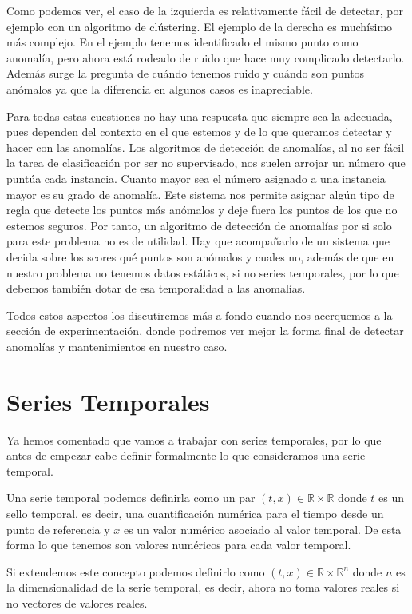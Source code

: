 Como podemos ver, el caso de la izquierda es relativamente fácil de detectar, por ejemplo con un algoritmo de clústering. El ejemplo de la derecha es muchísimo más complejo. En el ejemplo tenemos identificado el mismo punto como anomalía, pero ahora está rodeado de ruido que hace muy complicado detectarlo. Además surge la pregunta de cuándo tenemos ruido y cuándo son puntos anómalos ya que la diferencia en algunos casos es inapreciable.

Para todas estas cuestiones no hay una respuesta que siempre sea la adecuada, pues dependen del contexto en el que estemos y de lo que queramos detectar y hacer con las anomalías. Los algoritmos de detección de anomalías, al no ser fácil la tarea de clasificación por ser no supervisado, nos suelen arrojar un número que puntúa cada instancia. Cuanto mayor sea el número asignado a una instancia mayor es su grado de anomalía. Este sistema nos permite asignar algún tipo de regla que detecte los puntos más anómalos y deje fuera los puntos de los que no estemos seguros. Por tanto, un algoritmo de detección de anomalías por si solo para este problema no es de utilidad. Hay que acompañarlo de un sistema que decida sobre los scores qué puntos son anómalos y cuales no, además de que en nuestro problema no tenemos datos estáticos, si no series temporales, por lo que debemos también dotar de esa temporalidad a las anomalías.

Todos estos aspectos los discutiremos más a fondo cuando nos acerquemos a la sección de experimentación, donde podremos ver mejor la forma final de detectar anomalías y mantenimientos en nuestro caso.

\section{Series Temporales}

Ya hemos comentado que vamos a trabajar con series temporales, por lo que antes de empezar cabe definir formalmente lo que consideramos una serie temporal.

Una serie temporal podemos definirla como un par $(t,x)\in \mathbb{R}\times \mathbb{R}$ donde $t$ es un sello temporal, es decir, una cuantificación numérica para el tiempo desde un punto de referencia y $x$ es un valor numérico asociado al valor temporal. De esta forma lo que tenemos son valores numéricos para cada valor temporal.

Si extendemos este concepto podemos definirlo como $(t,x)\in \mathbb{R}\times \mathbb{R}^n$ donde $n$ es la dimensionalidad de la serie temporal, es decir, ahora no toma valores reales si no vectores de valores reales.

